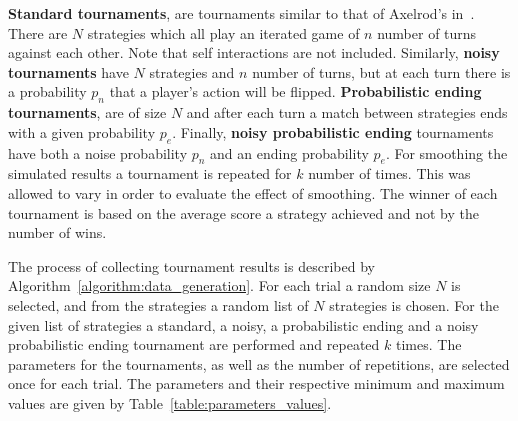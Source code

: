 \documentclass{article}
\newcommand{\numberofstrategies}{}
\begin{document}
\textbf{Standard tournaments}, are tournaments similar to that of Axelrod's
in~\cite{Axelrod1980a}. There are \(N\) strategies which all play an iterated
game of \(n\) number of turns against each other. Note that self interactions
are not included. Similarly, \textbf{noisy
tournaments} have \(N\) strategies and \(n\) number of turns, but at each turn
there is a probability \(p_n\) that a player's action will be flipped.
\textbf{Probabilistic ending tournaments}, are of size \(N\) and after each turn
a match between strategies ends with a given probability \(p_e\). Finally,
\textbf{noisy probabilistic ending} tournaments have both a noise probability
\(p_n\) and an ending probability \(p_e\). For smoothing the simulated results a
tournament is repeated for \(k\) number of times. This was allowed to vary 
in order to evaluate the effect of smoothing. The winner of each tournament
is based on the average score a strategy achieved and not by the number of wins.

The process of collecting tournament results is described by
Algorithm~\ref{algorithm:data_generation}. For each trial a random size \(N\) is
selected, and from the \numberofstrategies strategies a random list of \(N\) strategies is
chosen. For the given list of strategies a standard, a noisy, a probabilistic
ending and a noisy probabilistic ending tournament are performed and repeated
\(k\) times. The parameters for the tournaments, as well as the number of
repetitions, are selected once for each trial. The parameters and their
respective minimum and maximum values are given by
Table~\ref{table:parameters_values}.

\begin{table}[!htbp]
    \begin{center}
    \end{center}
    \caption{Data collection; parameters' values}
    \label{table:parameters_values}
\end{table}
\end{document}
